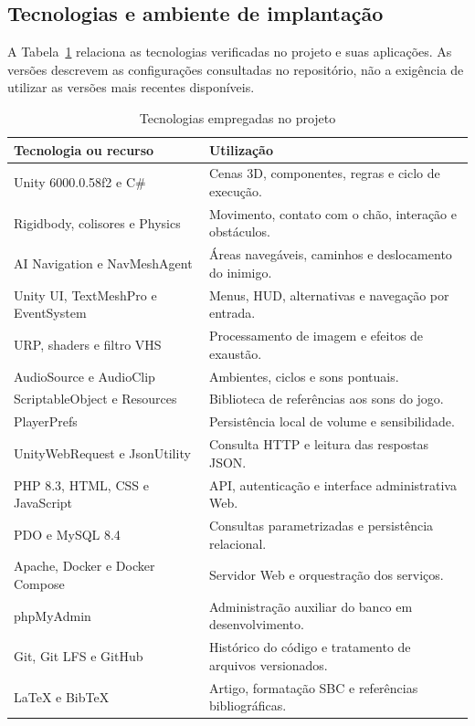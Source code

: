 \documentclass[12pt]{article}
\begin{document}
\subsection{Tecnologias e ambiente de implantação}

A Tabela~\ref{tab:tecnologias} relaciona as tecnologias verificadas no projeto e suas aplicações. As versões descrevem as configurações consultadas no repositório, não a exigência de utilizar as versões mais recentes disponíveis.

\begin{table}[H]
\centering
\caption{Tecnologias empregadas no projeto}
\label{tab:tecnologias}
\small
\begin{tabularx}{\textwidth}{p{4.2cm}X}
\toprule
\textbf{Tecnologia ou recurso} & \textbf{Utilização} \\
\midrule
Unity 6000.0.58f2 e C\# & Cenas 3D, componentes, regras e ciclo de execução. \\
Rigidbody, colisores e Physics & Movimento, contato com o chão, interação e obstáculos. \\
AI Navigation e NavMeshAgent & Áreas navegáveis, caminhos e deslocamento do inimigo. \\
Unity UI, TextMeshPro e EventSystem & Menus, HUD, alternativas e navegação por entrada. \\
URP, shaders e filtro VHS & Processamento de imagem e efeitos de exaustão. \\
AudioSource e AudioClip & Ambientes, ciclos e sons pontuais. \\
ScriptableObject e Resources & Biblioteca de referências aos sons do jogo. \\
PlayerPrefs & Persistência local de volume e sensibilidade. \\
UnityWebRequest e JsonUtility & Consulta HTTP e leitura das respostas JSON. \\
PHP 8.3, HTML, CSS e JavaScript & API, autenticação e interface administrativa Web. \\
PDO e MySQL 8.4 & Consultas parametrizadas e persistência relacional. \\
Apache, Docker e Docker Compose & Servidor Web e orquestração dos serviços. \\
phpMyAdmin & Administração auxiliar do banco em desenvolvimento. \\
Git, Git LFS e GitHub & Histórico do código e tratamento de arquivos versionados. \\
LaTeX e BibTeX & Artigo, formatação SBC e referências bibliográficas. \\
\bottomrule
\end{tabularx}
\end{table}
\end{document}
